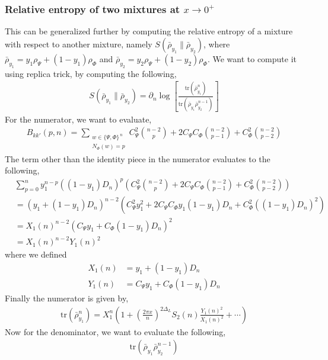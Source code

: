\documentclass[11pt]{article}
\newcommand{\p}{\partial}
\newcommand{\lb}{\left(}
\newcommand{\rb}{\right)}
\begin{document}
\subsubsection{\texorpdfstring{Relative entropy of two mixtures at $x\to 0^+$}
{Relative entropy of two mixtures at x -> 0+}}

This can be generalized further by computing the relative entropy of a mixture with respect to another mixture, namely $S(\bar{\rho}_{y_1} \| \bar{\rho}_{y_2} )$, where $\bar{\rho}_{y_1}=y_1\rho_\Psi+(1-y_1)\rho_\Phi$ and $\bar{\rho}_{y_2}=y_2\rho_\Psi+(1-y_2)\rho_\Phi$. 
We want to compute it using replica trick, by computing the following,
\begin{align}
    S(\bar{\rho}_{y_1} \| \bar{\rho}_{y_2} ) = \p_n \log \left[\frac{\text{tr}(\bar{\rho}_{y_1}^n)}{\text{tr}(\bar{\rho}_{y_1}\bar{\rho}_{y_2}^{n-1})}\right]
\end{align}
For the numerator, we want to evaluate,
\begin{align}
    B_{kk'}(p,n) = \sum_{\substack{w\in\{\Psi,\Phi\}^{\,n}\\ N_\Phi(w)=p}} C_\Psi^2 \binom{n-2}{p} + 2C_\Psi C_\Phi \binom{n-2}{p-1} +C_\Phi^2\binom{n-2}{p-2}
\end{align}
The term other than the identity piece in the numerator evaluates to the following,
\begin{align}
    & \sum_{p=0}^{n} y_1^{n-p} \lb (1-y_1)D_n\rb^p\lb C_\Psi^2 \binom{n-2}{p} + 2C_\Psi C_\Phi \binom{n-2}{p-1} +C_\Phi^2\binom{n-2}{p-2} \rb \\
    &= \lb y_1+ (1-y_1 )D_n\rb^{n-2} \lb C_\Psi^2 y_1^2 + 2C_\Psi C_\Phi y_1(1-y_1)D_n + C_\Phi^2 ((1-y_1)D_n)^2  \rb \\
    &= X_1(n)^{n-2} \lb C_\Psi y_1 + C_\Phi(1-y_1)D_n \rb^2 \\
    &= X_1(n)^{n-2}Y_1(n)^{2}
\end{align}
where we defined
\begin{align}
    X_1(n) &= y_1 + (1-y_1)D_n \\
    Y_1(n) &=  C_\Psi y_1 + C_\Phi(1-y_1)D_n 
\end{align}
Finally the numerator is given by,
\begin{align}
    \text{tr}(\bar{\rho}_{y_1}^n) = X_1^n\lb1 + \lb\frac{2\pi x}{n}\rb^{2\Delta_L} S_2(n) \frac{Y_1(n)^2}{X_1(n)^2} + \cdots \rb
\end{align}
Now for the denominator, we want to evaluate the following, 
\begin{align}
    \text{tr}\lb \bar{\rho}_{y_1}\bar{\rho}_{y_2}^{n-1}  \rb
\end{align}
\end{document}
